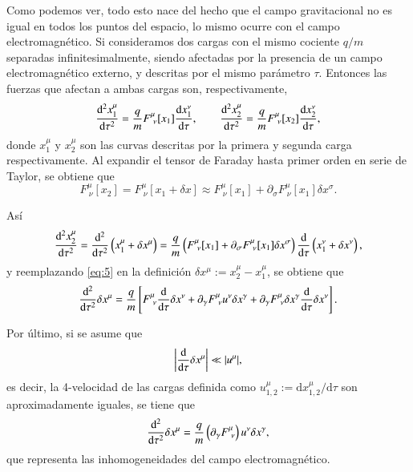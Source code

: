 Como podemos ver, todo esto nace del hecho que el campo gravitacional no es igual en todos los puntos del espacio, lo mismo ocurre con el campo electromagnético. Si consideramos dos cargas con el mismo cociente $q/m$ separadas infinitesimalmente, siendo afectadas por la presencia de un campo electromagnético externo, y descritas por el mismo parámetro $\tau$. Entonces las fuerzas que afectan a ambas cargas son, respectivamente,
\begin{equation}
\label{eq:4}
\dv[2]{x_1^{\mu}}{\tau} = \frac{q}{m} F^{\mu}_{\ \nu}[x_1] \dv{x_1^{\nu}}{\tau}, \qquad 
\dv[2]{x_2^{\mu}}{\tau} = \frac{q}{m} F^{\mu}_{\ \nu}[x_2] \dv{x_2^{\nu}}{\tau},
\end{equation}
donde $x_1^{\mu}$ y $x_2^{\mu}$ son las curvas descritas por la primera y segunda carga respectivamente. Al expandir el tensor de Faraday hasta primer orden en serie de Taylor, se obtiene que
\begin{equation}
F^{\mu}_{\ \nu}[x_2] = F^{\mu}_{\ \nu}[x_1 + \delta x] \approx F^{\mu}_{\ \nu}[x_1] + \partial_{\sigma} F^{\mu}_{\ \nu}[x_1] \delta x^{\sigma}.
\end{equation}

Así 
\begin{equation}
\label{eq:5}
\dv[2]{x_2^{\mu}}{\tau} = \dv[2]{ }{\tau} \left( x_1^{\mu} + \delta x^{\mu} \right) = \frac{q}{m} \left( F^{\mu}_{\ \nu}[x_1] + \partial_{\sigma} F^{\mu}_{\ \nu}[x_1] \delta x^{\sigma} \right) \dv{ }{\tau} \left( x_1^{\nu} + \delta x^{\nu} \right),
\end{equation}
y reemplazando \eqref{eq:5} en la definición $\delta x^{\mu} := x_2^{\mu} - x_1^{\mu}$, se obtiene que
\begin{equation}
\dv[2]{ }{\tau} \delta x^{\mu} = \frac{q}{m} \left[ F^{\mu}_{\ \nu} \dv{ }{\tau} \delta x^{\nu} + \partial_{\gamma} F^{\mu}_{\ \nu} u^{\nu} \delta x^{\gamma} + \partial_{\gamma} F^{\mu}_{\ \nu} \delta x^{\gamma} \dv{ }{\tau} \delta x^{\nu} \right].
\end{equation}

Por último, si se asume que
\begin{equation}
\left| \dv{\tau} \delta x^{\mu} \right| \ll |u^{\mu}|,
\end{equation}
es decir, la 4-velocidad de las cargas definida como $u^{\mu}_{1,2} := \mathrm{d}x^{\mu}_{1,2}/\mathrm{d}\tau $ son aproximadamente iguales, se tiene que
\begin{equation}
\label{eq:6}
\dv[2]{ }{\tau} \delta x^{\mu} = \frac{q}{m} \left( \partial_{\gamma} F^{\mu}_{\ \nu} \right) u^{\nu} \delta x^{\gamma},
\end{equation}
que representa las inhomogeneidades del campo electromagnético.

